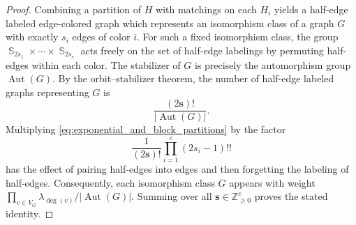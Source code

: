 \documentclass[10pt,a4paper]{amsart}
\DeclareMathOperator{\Aut}{Aut}
\DeclareMathOperator{\Sym}{\mathbb{S}}
\newcommand{\Z}{\mathbb{Z}}
\newcommand{\bb}[1]{\boldsymbol{#1}}
\begin{document}
\begin{proof}
Combining a partition of $H$ with matchings on each $H_i$ yields a half-edge labeled
edge-colored graph which represents an isomorphism class of a graph $G$ 
with
exactly $s_i$ edges of color $i$.
For such a fixed isomorphism class, the group
$\Sym_{2s_1}\times\cdots\times\Sym_{2s_c}$
acts freely on the set of half-edge labelings by permuting half-edges within
each color.
The stabilizer of $G$ is precisely the automorphism group $\Aut(G)$.
By the orbit--stabilizer theorem, the number of half-edge labeled graphs representing $G$ is
\[
\frac{(2\bb s)!}{|\Aut(G)|}.
\]
Multiplying \eqref{eq:exponential_and_block_partitions} by the factor
\[
\frac{1}{(2\bb s)!}\prod_{i=1}^c(2s_i-1)!!
\]
has the effect of pairing half-edges into edges and then forgetting the labeling of
half-edges.
Consequently, each isomorphism class $G$ appears with weight
$\prod_{v\in V_G}\lambda_{\deg(v)}/|\Aut(G)|$.
Summing over all $\bb s\in\Z_{\ge0}^c$ proves the stated identity.
\end{proof}
\end{document}
